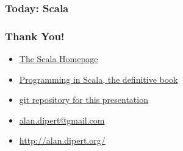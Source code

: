 \begin{frame} 
\frametitle{Today: Scala}
\tt\tiny{

}
\end{frame} 

\begin{frame} 
\frametitle{Thank You!}
\begin{itemize}
  \item<1-> \href{http://www.scala-lang.org/}{The Scala Homepage}
  \item<1-> \href{http://www.artima.com/shop/programming_in_scala}{Programming in Scala, the definitive book}
  \item<1-> \href{http://github.com/alandipert/scala-presentation/tree/master}{git repository for this presentation}
\end{itemize}
\begin{itemize}
  \item<1-> \href{mailto:alan.dipert@gmail.com}{alan.dipert@gmail.com}
  \item<1-> \href{http://alan.dipert.org/}{http://alan.dipert.org/}
\end{itemize}
\end{frame} 

 
